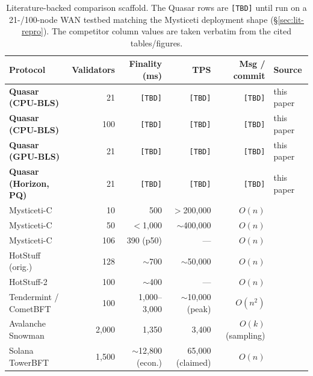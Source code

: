 \begin{table}[h]
\centering
\small
\begin{tabular}{@{}lrrrrl@{}}
\toprule
\textbf{Protocol} & \textbf{Validators} & \textbf{Finality (ms)} & \textbf{TPS} & \textbf{Msg / commit} & \textbf{Source} \\
\midrule
\textbf{Quasar (CPU-BLS)}     & 21   & \texttt{[TBD]} & \texttt{[TBD]} & \texttt{[TBD]} & this paper \\
\textbf{Quasar (CPU-BLS)}     & 100  & \texttt{[TBD]} & \texttt{[TBD]} & \texttt{[TBD]} & this paper \\
\textbf{Quasar (GPU-BLS)}     & 21   & \texttt{[TBD]} & \texttt{[TBD]} & \texttt{[TBD]} & this paper \\
\textbf{Quasar (Horizon, PQ)} & 21   & \texttt{[TBD]} & \texttt{[TBD]} & \texttt{[TBD]} & this paper \\
\midrule
Mysticeti-C                   & 10   & 500            & $>$200{,}000    & $O(n)$        & \cite[Fig.~5]{babel2024mysticeti} \\
Mysticeti-C                   & 50   & $<$1{,}000     & $\sim$400{,}000 & $O(n)$        & \cite[Fig.~6]{babel2024mysticeti} \\
Mysticeti-C                   & 106  & 390 (p50)      & ---             & $O(n)$        & \cite[\S6.3]{babel2024mysticeti} \\
HotStuff (orig.)              & 128  & $\sim$700      & $\sim$50{,}000  & $O(n)$        & \cite[\S5.3]{yin2019hotstuff} \\
HotStuff-2                    & 100  & $\sim$400      & ---             & $O(n)$        & \cite[\S6]{malkhi2023hotstuff2} \\
Tendermint / CometBFT         & 100  & 1{,}000--3{,}000 & $\sim$10{,}000 (peak) & $O(n^2)$ & \cite{cometbftgithub,alqahtani2021bottlenecks} \\
Avalanche Snowman             & 2{,}000 & 1{,}350     & 3{,}400          & $O(k)$ (sampling) & \cite[Table~5]{rocket2019avalanche} \\
Solana TowerBFT               & 1{,}500 & $\sim$12{,}800 (econ.) & 65{,}000 (claimed) & $O(n)$ & \cite{yakovenko2018solana} \\
\bottomrule
\end{tabular}
\caption{Literature-backed comparison scaffold. The Quasar rows are
\texttt{[TBD]} until run on a 21-/100-node WAN testbed matching the
Mysticeti deployment shape (\S\ref{sec:lit-repro}). The competitor
column values are taken verbatim from the cited tables/figures.}
\label{tab:quasar-lit-comparison}
\end{table}

